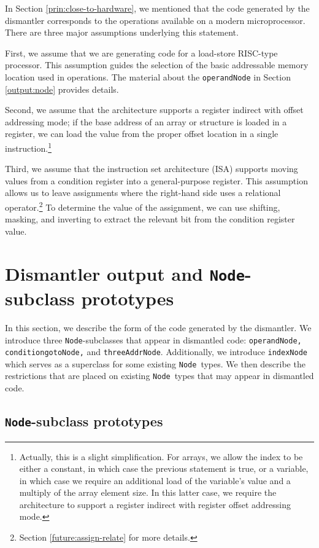 \documentclass{article}
\newcommand{\node}{\texttt{Node}}
\begin{document}
In Section \ref{prin:close-to-hardware}, we mentioned that the code
generated by the dismantler corresponds to the operations available on
a modern microprocessor.  There are three major assumptions underlying
this statement.

First, we assume that we are generating code for a load-store
RISC-type processor.  This assumption guides the selection of the
basic addressable memory location used in operations.  The material
about the \texttt{operandNode} in Section \ref{output:node} provides
details.

Second, we assume that the architecture supports a register indirect
with offset addressing mode; if the base address of an array or
structure is loaded in a register, we can load the value from the
proper offset location in a single instruction.\footnote{Actually,
this is a slight simplification.  For arrays, we allow the index to be
either a constant, in which case the previous statement is true, or a
variable, in which case we require an additional load of the
variable's value and a multiply of the array element size.  In this
latter case, we require the architecture to support a register indirect
with register offset addressing mode.}

Third, we assume that the instruction set architecture (ISA) supports
moving values from a condition register into a general-purpose
register.  This assumption allows us to leave assignments where the
right-hand side uses a relational operator.\footnote{Section
\ref{future:assign-relate} for more details.}  To determine the value
of the assignment, we can use shifting, masking, and inverting to
extract the relevant bit from the condition register value.

\section{\label{output} Dismantler output and \node-subclass prototypes}

In this section, we describe the form of the code generated by the
dismantler.  We introduce three \node-subclasses that appear in
dismantled code: \texttt{operandNode, conditiongotoNode,} and 
\texttt{threeAddrNode}.  Additionally, we introduce \texttt{indexNode}
which serves as a superclass for some existing \node\ types.  We then
describe the restrictions that are placed on existing \node\ types
that may appear in dismantled code.

\subsection{\label{output:node} \node-subclass prototypes}
\end{document}
